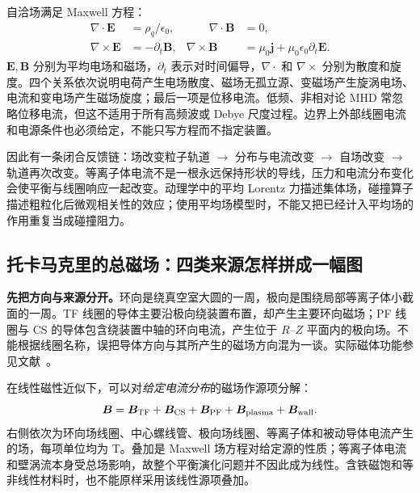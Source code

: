 \documentclass[12pt,fontset=none]{ctexart}
\numberwithin{equation}{section}
\numberwithin{table}{section}
\numberwithin{figure}{section}
\begin{document}
自洽场满足 Maxwell 方程：
\begin{equation}\label{eq:micro-maxwell}
 \begin{aligned}
 \nabla\cdot\bm E&=\rho_q/\epsilon_0,&\qquad \nabla\cdot\bm B&=0,\\
 \nabla\times\bm E&=-\partial_t\bm B,&
 \nabla\times\bm B&=\mu_0\bm j+\mu_0\epsilon_0\partial_t\bm E.
 \end{aligned}
\end{equation}
$\bm E,\bm B$ 分别为平均电场和磁场，$\partial_t$ 表示对时间偏导，$\nabla\cdot$ 和 $\nabla\times$ 分别为散度和旋度。四个关系依次说明电荷产生电场散度、磁场无孤立源、变磁场产生旋涡电场、电流和变电场产生磁场旋度；最后一项是位移电流。低频、非相对论 MHD 常忽略位移电流，但这不适用于所有高频波或 Debye 尺度过程。边界上外部线圈电流和电源条件也必须给定，不能只写方程而不指定装置。

因此有一条闭合反馈链：场改变粒子轨道 $\to$ 分布与电流改变 $\to$ 自场改变 $\to$ 轨道再次改变。等离子体电流不是一根永远保持形状的导线，压力和电流分布变化会使平衡与线圈响应一起改变。动理学中的平均 Lorentz 力描述集体场，碰撞算子描述粗粒化后微观相关性的效应；使用平均场模型时，不能又把已经计入平均场的作用重复当成碰撞阻力\cite{Poperator}。

\subsection{托卡马克里的总磁场：四类来源怎样拼成一幅图}\label{sec:micro-field}

\textbf{先把方向与来源分开。}环向是绕真空室大圆的一周，极向是围绕局部等离子体小截面的一周。TF 线圈的导体主要沿极向绕装置布置，却产生主要环向磁场；PF 线圈与 CS 的导体包含绕装置中轴的环向电流，产生位于 $R$--$Z$ 平面内的极向场。不能根据线圈名称，误把导体方向与其所产生的磁场方向混为一谈。实际磁体功能参见文献~\cite{C2,C3}。

在线性磁性近似下，可以对\emph{给定电流分布}的磁场作源项分解：
\begin{equation}\label{eq:micro-superposition}
 \bm B=\bm B_{\rm TF}+\bm B_{\rm CS}+\bm B_{\rm PF}
 +\bm B_{\rm plasma}+\bm B_{\rm wall}.
\end{equation}
右侧依次为环向场线圈、中心螺线管、极向场线圈、等离子体和被动导体电流产生的场，每项单位均为 T。叠加是 Maxwell 场方程对给定源的性质；等离子体电流和壁涡流本身受总场影响，故整个平衡演化问题并不因此成为线性。含铁磁饱和等非线性材料时，也不能原样采用该线性源项叠加。
\end{document}
